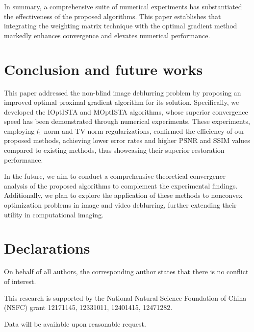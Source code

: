 \documentclass{article}
\begin{document}
In summary, a comprehensive suite of numerical experiments has substantiated the effectiveness of the proposed algorithms. This paper establishes that integrating the weighting matrix technique with the optimal gradient method markedly enhances convergence and elevates numerical performance.

\section{Conclusion and future works}\label{conclusion-part}
This paper addressed the non-blind image deblurring problem by proposing an improved optimal proximal gradient algorithm for its solution. Specifically, we developed the IOptISTA and MOptISTA algorithms, whose superior convergence speed has been demonstrated through numerical experiments. These experiments, employing $l_1$ norm and TV norm regularizations, confirmed the efficiency of our proposed methods, achieving lower error rates and higher PSNR and SSIM values compared to existing methods, thus showcasing their superior restoration performance.

In the future, we aim to conduct a comprehensive theoretical convergence analysis of the proposed algorithms to complement the experimental findings. Additionally, we plan to explore the application of these methods to nonconvex optimization problems in image and video deblurring, further extending their utility in computational imaging.

\bigskip
\section*{Declarations}
 On behalf of all authors, the corresponding author states that there is no conflict of interest. 

 {This research is supported by the National Natural Science Foundation of China (NSFC) grant 12171145, 12331011, 12401415, 12471282.}

 Data will be available upon reasonable request. 

\newpage
\appendix
\end{document}
